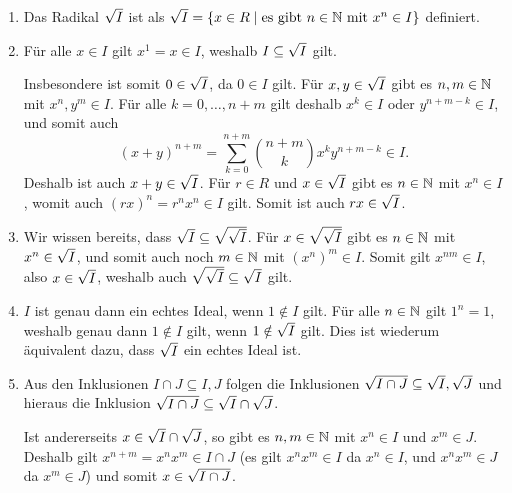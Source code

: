 \begin{solution}
  \begin{enumerate}
    \item
      Das Radikal $\sqrt{I}$ ist als $\sqrt{I} = \{ x \in R \mid \text{es gibt $n \in \mathbb{N}$ mit $x^n \in I$} \}$ definiert.
      
    \item
      Für alle $x \in I$ gilt $x^1 = x \in I$, weshalb $I \subseteq \sqrt{I}$ gilt.
      
      Insbesondere ist somit $0 \in \sqrt{I}$, da $0 \in I$ gilt.
      Für $x, y \in \sqrt{I}$ gibt es $n, m \in \mathbb{N}$ mit $x^n, y^m \in I$.
      Für alle $k = 0, \dotsc, n+m$ gilt deshalb $x^k \in I$ oder $y^{n+m-k} \in I$, und somit auch
      \[
          (x + y)^{n+m}
        = \sum_{k=0}^{n+m} \binom{n+m}{k} x^k y^{n+m-k} \in I.
      \]
      Deshalb ist auch $x + y \in \sqrt{I}$.
      Für $r \in R$ und $x \in \sqrt{I}$ gibt es $n \in \mathbb{N}$ mit $x^n \in I$, womit auch $(r x)^n = r^n x^n \in I$ gilt.
      Somit ist auch $r x \in \sqrt{I}$.
      
    \item
      Wir wissen bereits, dass $\sqrt{I} \subseteq \sqrt{\sqrt{I}}$.
      Für $x \in \sqrt{\sqrt{I}}$ gibt es $n \in \mathbb{N}$ mit $x^n \in \sqrt{I}$, und somit auch noch $m \in \mathbb{N}$ mit $(x^n)^m \in I$.
      Somit gilt $x^{nm} \in I$, also $x \in \sqrt{I}$, weshalb auch $\sqrt{\sqrt{I}} \subseteq \sqrt{I}$ gilt.
    
    \item
      $I$ ist genau dann ein echtes Ideal, wenn $1 \notin I$ gilt.
      Für alle $n \in \mathbb{N}$ gilt $1^n = 1$, weshalb genau dann $1 \notin I$ gilt, wenn $1 \notin \sqrt{I}$ gilt.
      Dies ist wiederum äquivalent dazu, dass $\sqrt{I}$ ein echtes Ideal ist.
    
    \item
      Aus den Inklusionen $I \cap J \subseteq I, J$ folgen die Inklusionen $\sqrt{I \cap J} \subseteq \sqrt{I}, \sqrt{J}$ und hieraus die Inklusion $\sqrt{I \cap J} \subseteq \sqrt{I} \cap \sqrt{J}$.
      
      Ist andererseits $x \in \sqrt{I} \cap \sqrt{J}$, so gibt es $n, m \in \mathbb{N}$ mit $x^n \in I$ und $x^m \in J$.
      Deshalb gilt $x^{n+m} = x^n x^m \in I \cap J$ (es gilt $x^n x^m \in I$ da $x^n \in I$, und $x^n x^m \in J$ da $x^m \in J$) und somit $x \in \sqrt{I \cap J}$.
    

\end{enumerate}
\end{solution}
